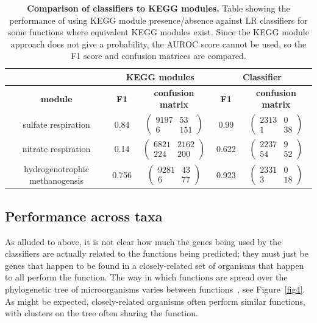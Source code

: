 \documentclass[10pt,letterpaper]{article}
\begin{document}
\begin{table}
\scriptsize
\begin{tabular}{|c|c|c|c|c|}\cline{2-5}%

 \multicolumn{1}{c|}{} &  \multicolumn{2}{|c|}{\bfseries KEGG modules} & \multicolumn{2}{|c|}{\bfseries Classifier} \\ \hline
 \rowcolor{LightGray} \bfseries module & \bfseries F1 & \bfseries confusion matrix & \bfseries F1 & \bfseries confusion matrix \\\hline
sulfate respiration & 0.84 & $\begin{pmatrix}9197 & 53 \\ 6 & 151\end{pmatrix}$ & 0.99 & $\begin{pmatrix}2313 & 0 \\ 1 & 38\end{pmatrix}$\\ \hline
nitrate respiration & 0.14 & $\begin{pmatrix}6821 & 2162\\ 224 & 200\end{pmatrix}$ & 0.622 & $\begin{pmatrix}2237 & 9 \\ 54 & 52\end{pmatrix}$\\ \hline
hydrogenotrophic methanogensis & 0.756 & $\begin{pmatrix}9281 & 43 \\ 6 & 77\end{pmatrix}$ & 0.923 & $\begin{pmatrix} 2331 & 0\\ 3 & 18\end{pmatrix}$\\ \hline
\end{tabular}

\caption{{\bf Comparison of classifiers to KEGG modules.}
Table showing the performance of using KEGG module presence/absence against LR classifiers for some functions where equivalent KEGG modules exist. Since the KEGG module approach does not give a probability, the AUROC score cannot be used, so the F1 score and confusion matrices are compared.}\label{tab2}
\end{table}

\subsection*{Performance across taxa}
As alluded to above, it is not clear how much the genes being used by the classifiers are actually related to the functions being predicted; they must just be genes that happen to be found in a closely-related set of organisms that happen to all perform the function. The way in which functions are spread over the phylogenetic tree of microorganisms varies between functions~\cite{Martiny2015}, see Figure~\ref{fig4}. As might be expected, closely-related organisms often perform similar functions, with clusters on the tree often sharing the function.
\end{document}
